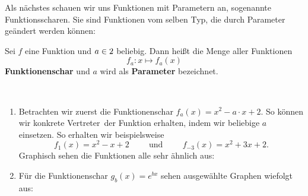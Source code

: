 \documentclass[ngerman, 12pt]{nssheetxea}
\begin{document}
Als nächstes schauen wir uns Funktionen mit Parametern an, sogenannte Funktionsscharen. Sie sind Funktionen vom selben Typ, die durch Parameter geändert werden können:

\begin{definition}
Sei $f$ eine Funktion und $a\in 2$ beliebig. Dann heißt die Menge aller Funktionen 
\[ f_a : x \mapsto f_a(x)\]
\textbf{Funktionenschar}  und $a$ wird als \textbf{Parameter} bezeichnet. 
\label{Def:Funktionenschar}
\end{definition}

\begin{example} \
\begin{enumerate}
\item Betrachten wir zuerst die Funktionenschar $f_a(x)=x^2-a\cdot x +2$. So können wir konkrete \glqq Vertreter\grqq \ der Funktion erhalten, indem wir beliebige $a$ einsetzen. So erhalten wir beispielsweise
\[ f_1(x)=x^2-x+2 \hspace{1cm} \text{und} \hspace{1cm} f_{-3}(x)=x^2+3x+2.\]
Graphisch sehen die Funktionen alle sehr ähnlich aus:
\begin{center}
\end{center}
\item Für die Funktionenschar $g_b(x)=e^{bx}$ sehen ausgewählte Graphen wiefolgt aus:
\begin{center}
\end{center}
\end{enumerate}
\end{example}
\end{document}
